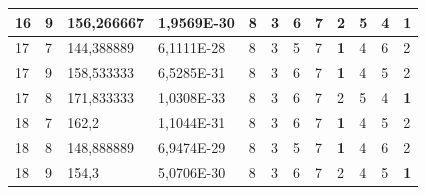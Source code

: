 \documentclass[conference]{IEEEtran}
\begin{document}
\begin{table}[]
\begin{tabular}{|llll|llllllll|}
		\multicolumn{1}{|l|}{16}  & \multicolumn{1}{l|}{9}         & \multicolumn{1}{l|}{156,266667}    & 1,9569E-30 & \multicolumn{1}{l|}{8}   & \multicolumn{1}{l|}{3}   & \multicolumn{1}{l|}{6}   & \multicolumn{1}{l|}{7}   & \multicolumn{1}{l|}{2}          & \multicolumn{1}{l|}{5}   & \multicolumn{1}{l|}{4}   & \textbf{1}             \\ \hline
		\multicolumn{1}{|l|}{17}  & \multicolumn{1}{l|}{7}         & \multicolumn{1}{l|}{144,388889}    & 6,1111E-28 & \multicolumn{1}{l|}{8}   & \multicolumn{1}{l|}{3}   & \multicolumn{1}{l|}{5}   & \multicolumn{1}{l|}{7}   & \multicolumn{1}{l|}{\textbf{1}} & \multicolumn{1}{l|}{4}   & \multicolumn{1}{l|}{6}   & 2                      \\ \hline
		\multicolumn{1}{|l|}{17}  & \multicolumn{1}{l|}{9}         & \multicolumn{1}{l|}{158,533333}    & 6,5285E-31 & \multicolumn{1}{l|}{8}   & \multicolumn{1}{l|}{3}   & \multicolumn{1}{l|}{6}   & \multicolumn{1}{l|}{7}   & \multicolumn{1}{l|}{\textbf{1}} & \multicolumn{1}{l|}{4}   & \multicolumn{1}{l|}{5}   & 2                      \\ \hline
		\multicolumn{1}{|l|}{17}  & \multicolumn{1}{l|}{8}         & \multicolumn{1}{l|}{171,833333}    & 1,0308E-33 & \multicolumn{1}{l|}{8}   & \multicolumn{1}{l|}{3}   & \multicolumn{1}{l|}{6}   & \multicolumn{1}{l|}{7}   & \multicolumn{1}{l|}{2}          & \multicolumn{1}{l|}{5}   & \multicolumn{1}{l|}{4}   & \textbf{1}             \\ \hline
		\multicolumn{1}{|l|}{18}  & \multicolumn{1}{l|}{7}         & \multicolumn{1}{l|}{162,2}         & 1,1044E-31 & \multicolumn{1}{l|}{8}   & \multicolumn{1}{l|}{3}   & \multicolumn{1}{l|}{6}   & \multicolumn{1}{l|}{7}   & \multicolumn{1}{l|}{\textbf{1}} & \multicolumn{1}{l|}{4}   & \multicolumn{1}{l|}{5}   & 2                      \\ \hline
		\multicolumn{1}{|l|}{18}  & \multicolumn{1}{l|}{8}         & \multicolumn{1}{l|}{148,888889}    & 6,9474E-29 & \multicolumn{1}{l|}{8}   & \multicolumn{1}{l|}{3}   & \multicolumn{1}{l|}{5}   & \multicolumn{1}{l|}{7}   & \multicolumn{1}{l|}{\textbf{1}} & \multicolumn{1}{l|}{4}   & \multicolumn{1}{l|}{6}   & 2                      \\ \hline
		\multicolumn{1}{|l|}{18}  & \multicolumn{1}{l|}{9}         & \multicolumn{1}{l|}{154,3}         & 5,0706E-30 & \multicolumn{1}{l|}{8}   & \multicolumn{1}{l|}{3}   & \multicolumn{1}{l|}{6}   & \multicolumn{1}{l|}{7}   & \multicolumn{1}{l|}{2}          & \multicolumn{1}{l|}{4}   & \multicolumn{1}{l|}{5}   & \textbf{1}             \\ \hline

\end{tabular}
\end{table}
\end{document}
